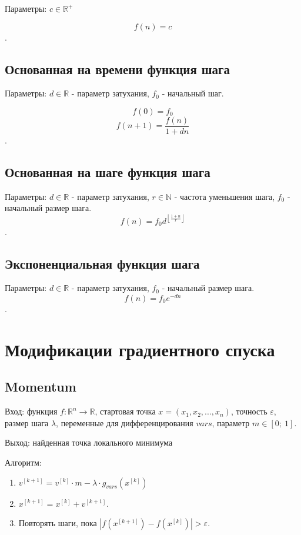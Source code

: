 \documentclass[a4paper,14pt,oneside,openany]{memoir}
\begin{document}
Параметры: $c \in \mathbb{R}^+$

$$f(n) = c$$.

\subsection{Основанная на времени функция шага}

Параметры: $d \in \mathbb{R}$ - параметр затухания, $f_0$ - начальный шаг. 

$$f(0) = f_0$$
$$f(n + 1) = \dfrac{f(n)}{1 + dn}$$. 

\subsection{Основанная на шаге функция шага}

Параметры: $d \in \mathbb{R}$ - параметр затухания, $r \in \mathbb{N}$ - частота уменьшения шага, $f_0$ - начальный размер шага.
$$f(n) = f_0d^{\left \lfloor{\frac{1 + n}{r}}\right \rfloor}$$.

\subsection{Экспоненциальная функция шага}

Параметры: $d \in \mathbb{R}$ - параметр затухания, $f_0$ - начальный размер шага.
$$f(n) = f_0e^{-dn}$$.
\newpage

\section{Модификации градиентного спуска}
\subsection{Momentum}
Вход: функция $f:\mathbb{R}^n \rightarrow \mathbb{R}$, стартовая точка $x = (x_1,x_2,...,x_n)$, точность $\varepsilon$, размер шага $\lambda$, переменные для дифференцирования $vars$, параметр $m \in [0;\ 1]$.

Выход: найденная точка локального минимума

Алгоритм:
\begin{enumerate}
	\item $v ^{[k+1]} = v^{[k]} \cdot m - \lambda \cdot g_{vars}(x^{[k]})$ 
	\item $x^{[k+1]} = x^{[k]} + v^{[k + 1]}$.
	\item Повторять шаги, пока  $|f(x^{[k+1]}) - f(x^{[k]})| > \varepsilon$.
\end{enumerate}
\end{document}
